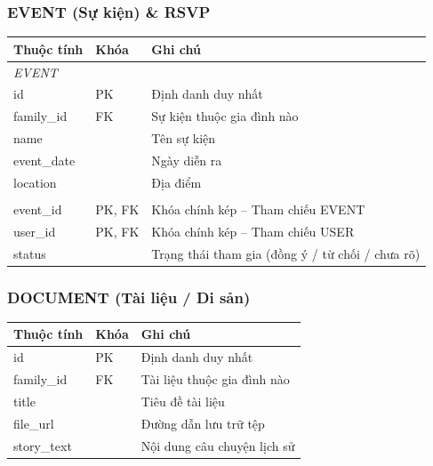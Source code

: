 \subsubsection{EVENT (Sự kiện) \& RSVP}
\begin{longtable}{@{}p{3cm}p{2cm}p{9.5cm}@{}}
\toprule
\textbf{Thuộc tính} & \textbf{Khóa} & \textbf{Ghi chú} \\
\midrule
\multicolumn{3}{l}{\textit{EVENT}} \\
id & PK & Định danh duy nhất \\
family\_id & FK & Sự kiện thuộc gia đình nào \\
name & & Tên sự kiện \\
event\_date & & Ngày diễn ra \\
location & & Địa điểm \\
\addlinespace
\multicolumn{3}{l}{\textit{RSVP}} \\
event\_id & PK, FK & Khóa chính kép -- Tham chiếu EVENT \\
user\_id & PK, FK & Khóa chính kép -- Tham chiếu USER \\
status & & Trạng thái tham gia (đồng ý / từ chối / chưa rõ) \\
\bottomrule
\end{longtable}

\subsubsection{DOCUMENT (Tài liệu / Di sản)}
\begin{longtable}{@{}p{3cm}p{2cm}p{9.5cm}@{}}
\toprule
\textbf{Thuộc tính} & \textbf{Khóa} & \textbf{Ghi chú} \\
\midrule
id & PK & Định danh duy nhất \\
family\_id & FK & Tài liệu thuộc gia đình nào \\
title & & Tiêu đề tài liệu \\
file\_url & & Đường dẫn lưu trữ tệp \\
story\_text & & Nội dung câu chuyện lịch sử \\
\bottomrule
\end{longtable}

